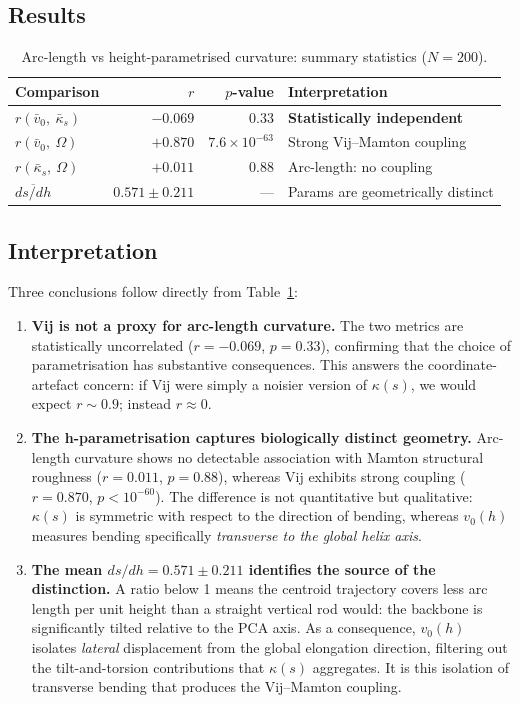 \subsection{Results}

\begin{table}[h]
\centering
\caption{Arc-length vs height-parametrised curvature: summary statistics ($N = 200$).}
\begin{tabular}{lrrl}
\toprule
Comparison & $r$ & $p$-value & Interpretation \\
\midrule
$r(\bar{v}_0,\ \bar{\kappa}_s)$ & $-0.069$ & $0.33$ & \textbf{Statistically independent} \\
$r(\bar{v}_0,\ \Omega)$ & $+0.870$ & $7.6 \times 10^{-63}$ & Strong Vij--Mamton coupling \\
$r(\bar{\kappa}_s,\ \Omega)$ & $+0.011$ & $0.88$ & Arc-length: no coupling \\
$\overline{ds/dh}$ & $0.571 \pm 0.211$ & --- & Params are geometrically distinct \\
\bottomrule
\end{tabular}
\label{tab:arclength_comparison}
\end{table}

\subsection{Interpretation}

Three conclusions follow directly from Table~\ref{tab:arclength_comparison}:

\begin{enumerate}
    \item \textbf{Vij is not a proxy for arc-length curvature.} The two metrics are statistically uncorrelated ($r = -0.069$, $p = 0.33$), confirming that the choice of parametrisation has substantive consequences. This answers the coordinate-artefact concern: if Vij were simply a noisier version of $\kappa(s)$, we would expect $r \sim 0.9$; instead $r \approx 0$.

    \item \textbf{The h-parametrisation captures biologically distinct geometry.} Arc-length curvature shows no detectable association with Mamton structural roughness ($r = 0.011$, $p = 0.88$), whereas Vij exhibits strong coupling ($r = 0.870$, $p < 10^{-60}$). The difference is not quantitative but qualitative: $\kappa(s)$ is symmetric with respect to the direction of bending, whereas $v_0(h)$ measures bending specifically \emph{transverse to the global helix axis}.

    \item \textbf{The mean $ds/dh = 0.571 \pm 0.211$ identifies the source of the distinction.} A ratio below 1 means the centroid trajectory covers less arc length per unit height than a straight vertical rod would: the backbone is significantly tilted relative to the PCA axis. As a consequence, $v_0(h)$ isolates \emph{lateral} displacement from the global elongation direction, filtering out the tilt-and-torsion contributions that $\kappa(s)$ aggregates. It is this isolation of transverse bending that produces the Vij--Mamton coupling.
\end{enumerate}


